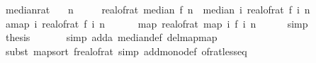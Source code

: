 \begin{isabellebody}
\endisatagproof
{\isafoldproof}%
%
\isadelimproof
\isanewline
%
\endisadelimproof
\isanewline
{}\isamarkupfalse%
\ median{\isacharunderscore}{\kern0pt}rat{\isacharcolon}{\kern0pt}\isanewline
\ \ \ {\isachardoublequoteopen}n\ {\isachargreater}{\kern0pt}\ {}{\isachardoublequoteclose}\isanewline
\ \ \ {\isachardoublequoteopen}real{\isacharunderscore}{\kern0pt}of{\isacharunderscore}{\kern0pt}rat\ {\isacharparenleft}{\kern0pt}median\ f\ n{\isacharparenright}{\kern0pt}\ {\isacharequal}{\kern0pt}\ median\ {\isacharparenleft}{\kern0pt}{\isasymlambda}i{\isachardot}{\kern0pt}\ real{\isacharunderscore}{\kern0pt}of{\isacharunderscore}{\kern0pt}rat\ {\isacharparenleft}{\kern0pt}f\ i{\isacharparenright}{\kern0pt}{\isacharparenright}{\kern0pt}\ n{\isachardoublequoteclose}\isanewline
%
\isadelimproof
%
\endisadelimproof
%
\isatagproof
{}\isamarkupfalse%
\ {\isacharminus}{\kern0pt}\isanewline
\ \ \isamarkupfalse%
\ a{\isacharcolon}{\kern0pt}{\isachardoublequoteopen}map\ {\isacharparenleft}{\kern0pt}{\isasymlambda}i{\isachardot}{\kern0pt}\ real{\isacharunderscore}{\kern0pt}of{\isacharunderscore}{\kern0pt}rat\ {\isacharparenleft}{\kern0pt}f\ i{\isacharparenright}{\kern0pt}{\isacharparenright}{\kern0pt}\ {\isacharbrackleft}{\kern0pt}{}{\isachardot}{\kern0pt}{\isachardot}{\kern0pt}{\isacharless}{\kern0pt}n{\isacharbrackright}{\kern0pt}\ {\isacharequal}{\kern0pt}\ \isanewline
\ \ \ \ map\ real{\isacharunderscore}{\kern0pt}of{\isacharunderscore}{\kern0pt}rat\ {\isacharparenleft}{\kern0pt}map\ {\isacharparenleft}{\kern0pt}{\isasymlambda}i{\isachardot}{\kern0pt}\ f\ i{\isacharparenright}{\kern0pt}\ {\isacharbrackleft}{\kern0pt}{}{\isachardot}{\kern0pt}{\isachardot}{\kern0pt}{\isacharless}{\kern0pt}n{\isacharbrackright}{\kern0pt}{\isacharparenright}{\kern0pt}{\isachardoublequoteclose}\isanewline
\ \ \ \ \isamarkupfalse%
\ {\isacharparenleft}{\kern0pt}simp{\isacharparenright}{\kern0pt}\isanewline
\ \ \isamarkupfalse%
\ {\isacharquery}{\kern0pt}thesis\ \isanewline
\ \ \ \ \isamarkupfalse%
\ {\isacharparenleft}{\kern0pt}simp\ add{\isacharcolon}{\kern0pt}a\ median{\isacharunderscore}{\kern0pt}def\ del{\isacharcolon}{\kern0pt}map{\isacharunderscore}{\kern0pt}map{\isacharparenright}{\kern0pt}\isanewline
\ \ \ \ \isamarkupfalse%
\ {\isacharparenleft}{\kern0pt}subst\ map{\isacharunderscore}{\kern0pt}sort{\isacharbrackleft}{\kern0pt}\ f{\isacharequal}{\kern0pt}{\isachardoublequoteopen}real{\isacharunderscore}{\kern0pt}of{\isacharunderscore}{\kern0pt}rat{\isachardoublequoteclose}{\isacharbrackright}{\kern0pt}{\isacharcomma}{\kern0pt}\ simp\ add{\isacharcolon}{\kern0pt}mono{\isacharunderscore}{\kern0pt}def\ of{\isacharunderscore}{\kern0pt}rat{\isacharunderscore}{\kern0pt}less{\isacharunderscore}{\kern0pt}eq{\isacharparenright}{\kern0pt}\isanewline

\end{isabellebody}
